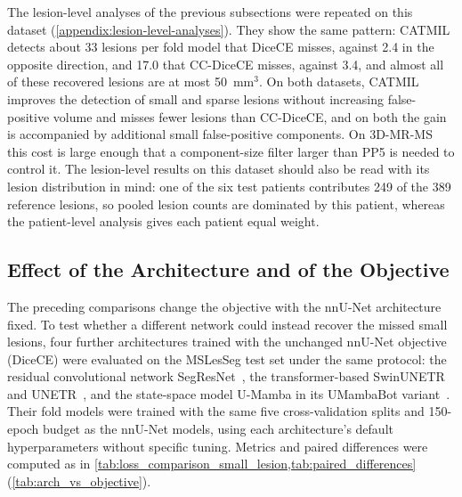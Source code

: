 The lesion-level analyses of the previous subsections were repeated on
this dataset (\cref{appendix:lesion-level-analyses}). They show the same
pattern: CATMIL detects about 33 lesions per fold model that DiceCE
misses, against 2.4 in the opposite direction, and 17.0 that CC-DiceCE
misses, against 3.4, and almost all of these recovered lesions are at most
50~mm$^3$. On both datasets, CATMIL improves the detection of small and
sparse lesions without increasing false-positive volume and misses fewer
lesions than CC-DiceCE, and on both the gain is accompanied by additional
small false-positive components. On 3D-MR-MS this cost is large enough
that a component-size filter larger than PP5 is needed to control it. The
lesion-level results on this dataset should also be read with its lesion
distribution in mind: one of the six test patients contributes 249 of the
389 reference lesions, so pooled lesion counts are dominated by this
patient, whereas the patient-level analysis gives each patient equal
weight.

\subsection{Effect of the Architecture and of the Objective}
\label{sec:arch_vs_objective}

The preceding comparisons change the objective with the nnU-Net
architecture fixed. To test whether a different network could instead
recover the missed small lesions, four further architectures trained with
the unchanged nnU-Net objective (DiceCE) were evaluated on the MSLesSeg
test set under the same protocol: the residual convolutional network
SegResNet~\cite{crimi_3d_2019}, the transformer-based
SwinUNETR~\cite{hatamizadeh_swin_2022} and
UNETR~\cite{hatamizadeh_unetr_2021}, and the state-space model U-Mamba in
its UMambaBot variant~\cite{ma_u-mamba_2024}. Their fold models were
trained with the same five cross-validation splits and 150-epoch budget as
the nnU-Net models, using each architecture's default hyperparameters
without specific tuning. Metrics and paired differences were computed as in
\cref{tab:loss_comparison_small_lesion,tab:paired_differences}
(\cref{tab:arch_vs_objective}).

